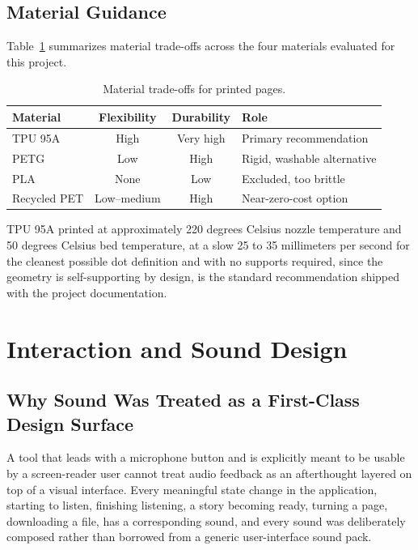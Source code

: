 \documentclass[conference]{IEEEtran}
\begin{document}
\subsection{Material Guidance}

Table~\ref{tab:materials} summarizes material trade-offs across the four materials evaluated for this project.

\begin{table}[t]
\caption{Material trade-offs for printed pages.}
\label{tab:materials}
\centering
\begin{tabular}{lccl}
\toprule
Material & Flexibility & Durability & Role \\
\midrule
TPU 95A & High & Very high & Primary recommendation \\
PETG & Low & High & Rigid, washable alternative \\
PLA & None & Low & Excluded, too brittle \\
Recycled PET & Low--medium & High & Near-zero-cost option \\
\bottomrule
\end{tabular}
\end{table}

TPU 95A printed at approximately 220 degrees Celsius nozzle temperature and 50 degrees Celsius bed temperature, at a slow 25 to 35 millimeters per second for the cleanest possible dot definition and with no supports required, since the geometry is self-supporting by design, is the standard recommendation shipped with the project documentation.

\section{Interaction and Sound Design}\label{sec:sound}

\subsection{Why Sound Was Treated as a First-Class Design Surface}

A tool that leads with a microphone button and is explicitly meant to be usable by a screen-reader user cannot treat audio feedback as an afterthought layered on top of a visual interface. Every meaningful state change in the application, starting to listen, finishing listening, a story becoming ready, turning a page, downloading a file, has a corresponding sound, and every sound was deliberately composed rather than borrowed from a generic user-interface sound pack.
\end{document}
